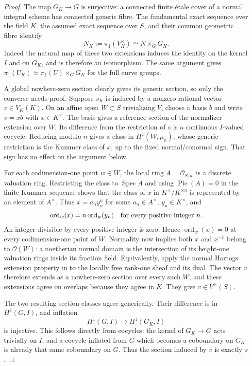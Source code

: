 \documentclass[11pt,a4paper]{article}
\theoremstyle{definition}
\begin{document}
\begin{proof}
The map $G_K\to G$ is surjective: a connected finite \'etale cover
of a normal integral scheme has connected generic fibre. The
fundamental exact sequence over the field $K$, the assumed exact
sequence over $S$, and their common geometric fibre identify
\[
 N_K:=\pi_1(V_K^\times)\simeq N\mathbin{\times}_G G_K.
                                                               \tag{RG.1}
\]
Indeed the natural map of these two extensions induces the identity
on the kernel $I$ and on $G_K$, and is therefore an isomorphism.
The same argument gives
$\pi_1(U_K)\simeq\pi_1(U)\times_GG_K$ for the full curve groups.

A global nowhere-zero section clearly gives its generic section,
so only the converse needs proof. Suppose $s_K$ is induced by a
nonzero rational vector $v\in V_K(K)$. On an affine open
$W\subset S$ trivializing $V$, choose a basis $b$ and write
$v=xb$ with $x\in K^\times$. The basis gives a reference section
of the normalizer extension over $W$. Its difference from the
restriction of $s$ is a continuous $I$-valued cocycle. Reducing
modulo $n$ gives a class in $H^1(W,\mu_n)$, whose generic restriction
is the Kummer class of $x$, up to the fixed normal/conormal sign.
That sign has no effect on the argument below.

For each codimension-one point $w\in W$, the local ring
$A=\mathcal O_{S,w}$ is a discrete valuation ring. Restricting the
class to $\operatorname{Spec}A$ and using $\operatorname{Pic}(A)=0$
in the finite Kummer sequence shows that the class of $x$ in
$K^\times/K^{\times n}$ is represented by an element of $A^\times$.
Thus $x=a_n y_n^n$ for some $a_n\in A^\times$, $y_n\in K^\times$,
and
\[
 \operatorname{ord}_w(x)=n\operatorname{ord}_w(y_n)
 \quad\hbox{for every positive integer }n.
\]
An integer divisible by every positive integer is zero. Hence
$\operatorname{ord}_w(x)=0$ at every codimension-one point of $W$.
Normality now implies both $x$ and $x^{-1}$ belong to
$\mathcal O(W)$: a noetherian normal domain is the intersection
of its height-one valuation rings inside its fraction field.
Equivalently, apply the normal Hartogs extension property in
\cite[Theorem~5.10.5 and proof, pp.~115--116]{EGAIV2} to the
locally free rank-one sheaf and its dual. The vector $v$ therefore
extends as a nowhere-zero section over every such $W$, and these
extensions agree on overlaps because they agree in $K$.
They give $v\in V^\times(S)$.

The two resulting section classes agree generically. Their
difference is in $H^1(G,I)$, and inflation
\[
 H^1(G,I)\longrightarrow H^1(G_K,I)
\]
is injective. This follows directly from cocycles: the kernel of
$G_K\to G$ acts trivially on $I$, and a cocycle inflated from $G$
which becomes a coboundary on $G_K$ is already that same
coboundary on $G$. Thus the section induced by $v$ is exactly $s$.


\end{proof}
\end{document}
